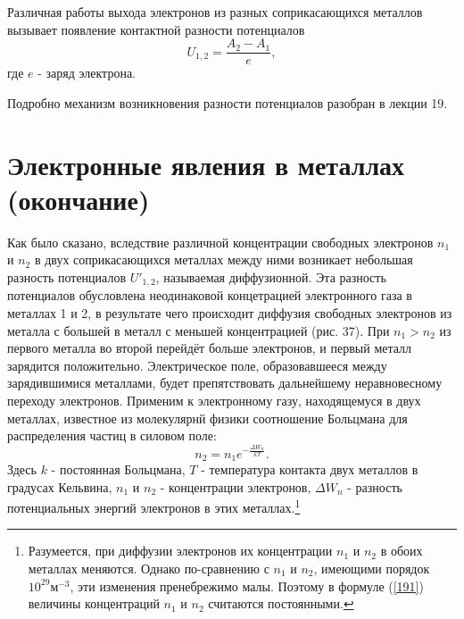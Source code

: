 \documentclass[a4paper,10pt]{book}
\begin{document}
Различная работы выхода электронов из разных соприкасающихся металлов вызывает появление контактной разности потенциалов
\begin{equation*}
 U_{1,2} = \frac{A_2 - A_1}{e},
\end{equation*}
где $e$ - заряд электрона.

Подробно механизм возникновения разности потенциалов разобран в лекции 19.
\chapter{Электронные явления в металлах (окончание)}
Как было сказано, вследствие различной концентрации свободных электронов $n_1$ и $n_2$ в двух соприкасающихся металлах между ними возникает небольшая разность потенциалов $U'_{1,2}$, называемая диффузионной. Эта разность потенциалов обусловлена неодинаковой концетрацией электронного газа в металлах 1 и 2, в результате чего происходит диффузия свободных электронов из металла с большей в металл с меньшей концентрацией (рис. 37). При $n_1 > n_2$ из первого металла во второй перейдёт больше электронов, и первый металл зарядится положительно. Электрическое поле, образовавшееся между зарядившимися металлами, будет препятствовать дальнейшему неравновесному переходу электронов. Применим к электронному газу, находящемуся в двух металлах, известное из молекулярнй физики соотношение Больцмана для распределения частиц в силовом поле:
\begin{equation}\label{191}
 n_2 = n_1e^{-\frac{\Delta W_n}{kT}}.
\end{equation}
Здесь $k$ - постоянная Больцмана, $T$ - температура контакта двух металлов в градусах Кельвина, $n_1$ и $n_2$ - концентрации электронов, $\Delta W_n$ - разность потенциальных энергий электронов в этих металлах.\footnote{Разумеется, при диффузии электронов их концентрации $n_1$ и $n_2$ в обоих металлах меняются. Однако по-сравнению с $n_1$ и $n_2$, имеющими порядок $10^29\text{м}^{-3}$, эти изменения пренебрежимо малы. Поэтому в формуле (\ref{191}) величины концентраций $n_1$ и $n_2$ считаются постоянными.}
\end{document}
